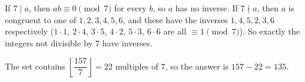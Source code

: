 If $7\mid a$, then $ab\equiv0\pmod 7$ for every $b$, so $a$ has no inverse. If $7\nmid a$, then $a$ is congruent to one of $1,2,3,4,5,6$, and these have the inverses $1,4,5,2,3,6$ respectively ($1\cdot1$, $2\cdot4$, $3\cdot5$, $4\cdot2$, $5\cdot3$, $6\cdot6$ are all $\equiv1\pmod7$). So exactly the integers not divisible by $7$ have inverses.

The set contains $\left\lfloor\dfrac{157}{7}\right\rfloor=22$ multiples of $7$, so the answer is $157-22=\boxed{135}$.
